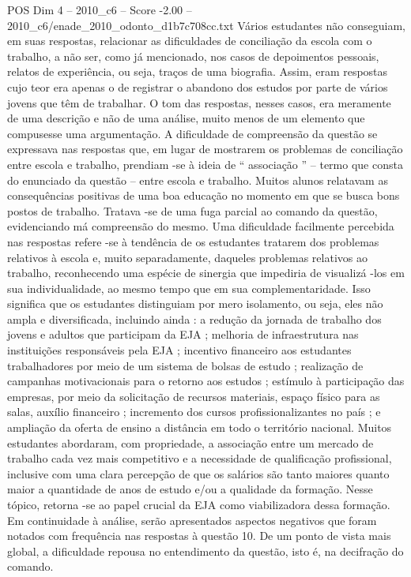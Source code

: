 \begin{textsample}{POS Dim 4 – 2010\_c6 – Score -2.00 – 2010\_c6/enade\_2010\_odonto\_d1b7c708cc.txt}
Vários estudantes não conseguiam, em suas respostas, relacionar as dificuldades de conciliação da escola com o trabalho, a não ser, como já mencionado, nos casos de depoimentos pessoais, relatos de experiência, ou seja, traços de uma biografia.
Assim, eram respostas cujo teor era apenas o de registrar o abandono dos estudos por parte de vários jovens que têm de trabalhar.
O tom das respostas, nesses casos, era meramente de uma descrição e não de uma análise, muito menos de um elemento que compusesse uma argumentação.
A dificuldade de compreensão da questão se expressava nas respostas que, em lugar de mostrarem os problemas de conciliação entre escola e trabalho, prendiam -se à ideia de “ associação ” – termo que consta do enunciado da questão – entre escola e trabalho.
Muitos alunos relatavam as consequências positivas de uma boa educação no momento em que se busca bons postos de trabalho.
Tratava -se de uma fuga parcial ao comando da questão, evidenciando má compreensão do mesmo.
Uma dificuldade facilmente percebida nas respostas refere -se à tendência de os estudantes tratarem dos problemas relativos à escola e, muito separadamente, daqueles problemas relativos ao trabalho, reconhecendo uma espécie de sinergia que impediria de visualizá -los em sua individualidade, ao mesmo tempo que em sua complementaridade.
Isso significa que os estudantes distinguiam por mero isolamento, ou seja, eles não ampla e diversificada, incluindo ainda : a redução da jornada de trabalho dos jovens e adultos que participam da EJA ; melhoria de infraestrutura nas instituições responsáveis pela EJA ; incentivo financeiro aos estudantes trabalhadores por meio de um sistema de bolsas de estudo ; realização de campanhas motivacionais para o retorno aos estudos ; estímulo à participação das empresas, por meio da solicitação de recursos materiais, espaço físico para as salas, auxílio financeiro ; incremento dos cursos profissionalizantes no país ; e ampliação da oferta de ensino a distância em todo o território nacional.
Muitos estudantes abordaram, com propriedade, a associação entre um mercado de trabalho cada vez mais competitivo e a necessidade de qualificação profissional, inclusive com uma clara percepção de que os salários são tanto maiores quanto maior a quantidade de anos de estudo e/ou a qualidade da formação.
Nesse tópico, retorna -se ao papel crucial da EJA como viabilizadora dessa formação.
Em continuidade à análise, serão apresentados aspectos negativos que foram notados com frequência nas respostas à questão 10.
De um ponto de vista mais global, a dificuldade repousa no entendimento da questão, isto é, na decifração do comando.

\end{textsample}
